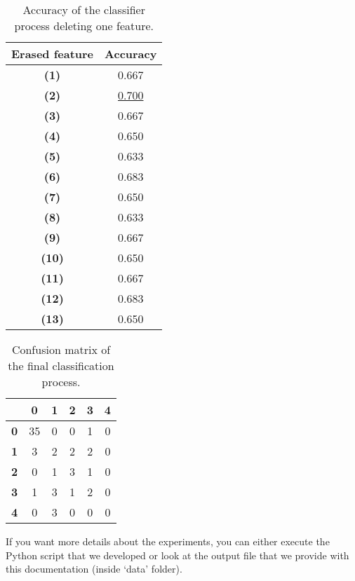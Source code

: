 \begin{table}[hbtp]
    \centering
    \begin{tabular}{c c}
        \toprule
        \textbf{Erased feature} & \textbf{Accuracy} \\ \midrule
        \textbf{(1)} & 0.667 \\
        \textbf{(2)} & \underline{0.700} \\
        \textbf{(3)} & 0.667 \\
        \textbf{(4)} & 0.650 \\
        \textbf{(5)} & 0.633 \\
        \textbf{(6)} & 0.683 \\
        \textbf{(7)} & 0.650 \\
        \textbf{(8)} & 0.633 \\
        \textbf{(9)} & 0.667 \\
        \textbf{(10)} & 0.650 \\
        \textbf{(11)} & 0.667 \\
        \textbf{(12)} & 0.683 \\
        \textbf{(13)} & 0.650 \\
        \bottomrule
    \end{tabular}
    \caption{Accuracy of the classifier process deleting one feature.}
    \label{tab:fourth_exp}
\end{table}


\begin{table}[hbtp]
    \centering
    \begin{tabular}{c c c c c c}
        \toprule
         & \textbf{0} & \textbf{1} & \textbf{2} & \textbf{3} & \textbf{4} \\ \midrule
        \textbf{0} &  35 & 0 & 0 & 1 & 0 \\
        \textbf{1} &  3 & 2 & 2 & 2 & 0 \\
        \textbf{2} &  0 & 1 & 3 & 1 & 0 \\
        \textbf{3} &  1 & 3 & 1 & 2 & 0 \\
        \textbf{4} &  0 & 3 & 0 & 0 & 0 \\
        \bottomrule
    \end{tabular}
    \caption{Confusion matrix of the final classification process.}
    \label{tab:fourth_exp_cm}
\end{table}

If you want more details about the experiments, you can either execute the Python script that we developed or look at the output file that we provide with this documentation (inside `data' folder).